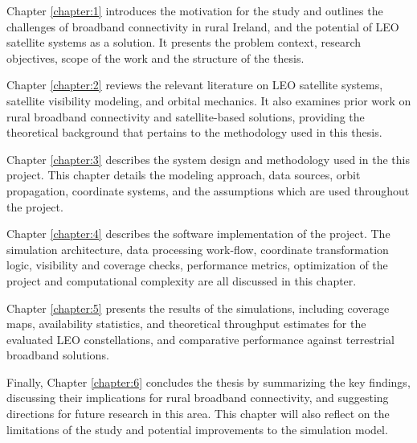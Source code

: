 Chapter \ref{chapter:1} introduces the motivation for the study and outlines the challenges of broadband connectivity in rural Ireland, and the potential of LEO satellite systems as a solution. It presents the problem context, research objectives, scope of the work and the structure of the thesis.

Chapter \ref{chapter:2} reviews the relevant literature on LEO satellite systems, satellite visibility modeling, and orbital mechanics. It also examines prior work on rural broadband connectivity and satellite-based solutions, providing the theoretical background that pertains to the methodology used in this thesis.

Chapter \ref{chapter:3} describes the system design and methodology used in the this project. This chapter details the modeling approach, data sources, orbit propagation, coordinate systems, and the assumptions which are used throughout the project.

Chapter \ref{chapter:4} describes the software implementation of the project. The simulation architecture, data processing work-flow, coordinate transformation logic, visibility and coverage checks, performance metrics, optimization of the project and computational complexity are all discussed in this chapter.

Chapter \ref{chapter:5} presents the results of the simulations, including coverage maps, availability statistics, and theoretical throughput estimates for the evaluated LEO constellations, and comparative performance against terrestrial broadband solutions. 

Finally, Chapter \ref{chapter:6} concludes the thesis by summarizing the key findings, discussing their implications for rural broadband connectivity, and suggesting directions for future research in this area. This chapter will also reflect on the limitations of the study and potential improvements to the simulation model.